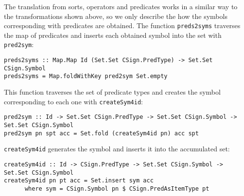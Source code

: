 The translation from sorts, operators and predicates works in a similar
way to the transformations shown above, so we only describe the 
how the symbols corresponding with predicates are obtained. The function
\verb"preds2syms" traverses the map of predicates and inserts each
obtained symbol into the set with \verb"pred2sym":

{\codesize
\begin{verbatim}
preds2syms :: Map.Map Id (Set.Set CSign.PredType) -> Set.Set CSign.Symbol
preds2syms = Map.foldWithKey pred2sym Set.empty
\end{verbatim}
}

This function traverses the set of predicate types and creates the
symbol corresponding to each one with \verb"createSym4id":

{\codesize
\begin{verbatim}
pred2sym :: Id -> Set.Set CSign.PredType -> Set.Set CSign.Symbol -> Set.Set CSign.Symbol
pred2sym pn spt acc = Set.fold (createSym4id pn) acc spt
\end{verbatim}
}

\verb"createSym4id" generates the symbol and inserts it into the
accumulated set:

{\codesize
\begin{verbatim}
createSym4id :: Id -> CSign.PredType -> Set.Set CSign.Symbol -> Set.Set CSign.Symbol
createSym4id pn pt acc = Set.insert sym acc
      where sym = CSign.Symbol pn $ CSign.PredAsItemType pt
\end{verbatim}
}





















